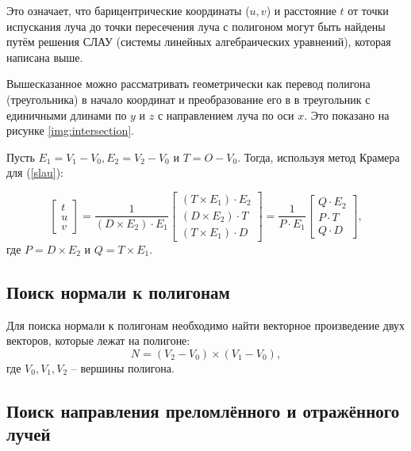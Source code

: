 Это означает, что барицентрические координаты ($u,v$) и расстояние $t$ от точки испускания луча до точки пересечения луча с полигоном могут быть найдены путём решения СЛАУ (системы линейных алгебраических уравнений), которая написана выше.

Вышесказанное можно рассматривать геометрически как перевод полигона (треугольника) в начало координат и преобразование его в в треугольник с единичными длинами по $y$ и $z$ с направлением луча по оси $x$. Это показано на рисунке
\ref{img:intersection}.



Пусть $E_1=V_1-V_0, E_2=V_2-V_0$ и $T=O - V_0$. Тогда, используя метод Крамера для (\ref{slau}):

\begin{equation}
\label{solution}
\begin{bmatrix}
t\\
u\\
v
\end{bmatrix} = \frac{1}{(D\times E_2) \cdot E_1}
\begin{bmatrix}
(T\times E_1) \cdot E_2\\
(D\times E_2) \cdot T\\
(T\times E_1) \cdot D
\end{bmatrix} = \frac{1}{P \cdot E_1}
\begin{bmatrix}
Q \cdot E_2\\
P \cdot T\\
Q \cdot D
\end{bmatrix},
\end{equation}
где $P = D \times E_2$ и $Q = T \times E_1$.

\subsection{Поиск нормали к полигонам}

Для поиска нормали к полигонам необходимо найти векторное произведение двух векторов, которые лежат на полигоне:
\begin{equation}
N = (V_2 - V_0) \times (V_1 - V_0),
\end{equation}
где $V_0, V_1, V_2$ -- вершины полигона.

\subsection{Поиск направления преломлённого и отражённого лучей}


